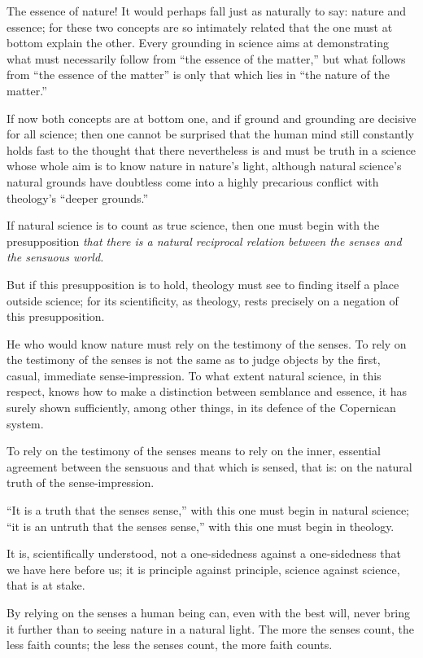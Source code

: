 \documentclass[12pt,a4paper]{article}
\begin{document}
The essence of nature! It would perhaps fall just as naturally to say: nature and
essence; for these two concepts are so intimately related that the one must at
bottom explain the other. Every grounding in science aims at demonstrating what must
necessarily follow from ``the essence of the matter,'' but what follows from ``the
essence of the matter'' is only that which lies in ``the nature of the matter.''

If now both concepts are at bottom one, and if ground and grounding are decisive
for all science; then one cannot be surprised that the human mind still constantly
holds fast to the thought that there nevertheless is and must be truth in a science
whose whole aim is to know nature in nature's light, although natural science's
natural grounds have doubtless come into a highly precarious conflict with
theology's ``deeper grounds.''

If natural science is to count as true science, then one must begin with the
presupposition \emph{that there is a natural reciprocal relation between the senses
and the sensuous world.}

But if this presupposition is to hold, theology must see to finding itself a place
outside science; for its scientificity, as theology, rests precisely on a negation
of this presupposition.

He who would know nature must rely on the testimony of the senses. To rely on the
testimony of the senses is not the same as to judge objects by the first, casual,
immediate sense-impression. To what extent natural science, in this respect, knows
how to make a distinction between semblance and essence, it has surely shown
sufficiently, among other things, in its defence of the Copernican system.

To rely on the testimony of the senses means to rely on the inner, essential
agreement between the sensuous and that which is sensed, that is: on the natural
truth of the sense-impression.

``It is a truth that the senses sense,'' with this one must begin in natural
science; ``it is an untruth that the senses sense,'' with this one must begin in
theology.

It is, scientifically understood, not a one-sidedness against a one-sidedness that
we have here before us; it is principle against principle, science against science,
that is at stake.

By relying on the senses a human being can, even with the best will, never bring it
further than to seeing nature in a natural light.
The more the senses count, the less faith counts; the less the senses count, the
more faith counts.
\end{document}
